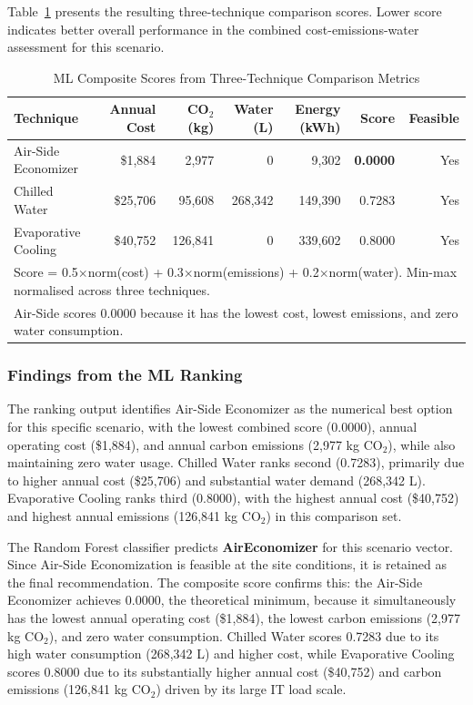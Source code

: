 ﻿\documentclass[12pt,a4paper]{report}
\begin{document}
Table~\ref{tab:ml_rank} presents the resulting three-technique comparison scores.
Lower score indicates better overall performance in the combined cost-emissions-water
assessment for this scenario.

\begin{table}[H]
\centering
\caption{ML Composite Scores from Three-Technique Comparison Metrics}
\label{tab:ml_rank}
\renewcommand{\arraystretch}{1.35}
\begin{tabular}{lrrrrrr}
\toprule
\textbf{Technique} & \textbf{Annual Cost} & \textbf{CO$_2$ (kg)} & \textbf{Water (L)} & \textbf{Energy (kWh)} & \textbf{Score} & \textbf{Feasible} \\
\midrule
Air-Side Economizer  & \$1{,}884   & 2{,}977    & 0         & 9{,}302    & \textbf{0.0000} & Yes \\
Chilled Water        & \$25{,}706  & 95{,}608   & 268{,}342 & 149{,}390  & 0.7283          & Yes \\
Evaporative Cooling  & \$40{,}752  & 126{,}841  & 0         & 339{,}602  & 0.8000          & Yes \\
\bottomrule
\multicolumn{7}{l}{\small Score = 0.5$\times$norm(cost) + 0.3$\times$norm(emissions) + 0.2$\times$norm(water). Min-max normalised across three techniques.}\\
\multicolumn{7}{l}{\small Air-Side scores 0.0000 because it has the lowest cost, lowest emissions, and zero water consumption.}\\
\end{tabular}
\end{table}

\subsubsection{Findings from the ML Ranking}

The ranking output identifies Air-Side Economizer as the numerical best option for this
specific scenario, with the lowest combined score (0.0000), annual operating cost
(\$1{,}884), and annual carbon emissions (2{,}977 kg CO$_2$), while also maintaining
zero water usage. Chilled Water ranks second (0.7283), primarily due to higher annual
cost (\$25{,}706) and substantial water demand (268{,}342 L). Evaporative Cooling ranks
third (0.8000), with the highest annual cost (\$40{,}752) and highest annual emissions
(126{,}841 kg CO$_2$) in this comparison set.

\noindent The Random Forest classifier predicts \textbf{AirEconomizer} for this scenario
vector. Since Air-Side Economization is feasible at the site conditions, it is retained
as the final recommendation. The composite score confirms this: the Air-Side Economizer
achieves 0.0000, the theoretical minimum, because it simultaneously has the lowest
annual operating cost (\$1{,}884), the lowest carbon emissions (2{,}977 kg CO$_2$), and
zero water consumption. Chilled Water scores 0.7283 due to its high water consumption
(268{,}342 L) and higher cost, while Evaporative Cooling scores 0.8000 due to its
substantially higher annual cost (\$40{,}752) and carbon emissions (126{,}841 kg CO$_2$)
driven by its large IT load scale.
\end{document}

